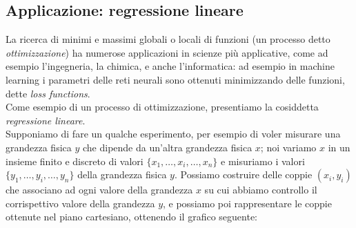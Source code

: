 \subsection{Applicazione: regressione lineare}
La ricerca di minimi e massimi globali o locali di funzioni (un processo detto \emph{ottimizzazione}) ha numerose applicazioni in scienze più applicative, come ad esempio l'ingegneria, la chimica, e anche l'informatica: ad esempio in machine learning i parametri delle reti neurali sono ottenuti minimizzando delle funzioni, dette \emph{loss functions}.\\
Come esempio di un processo di ottimizzazione, presentiamo la cosiddetta \emph{regressione lineare}.\\
Supponiamo di fare un qualche esperimento, per esempio di voler misurare una grandezza fisica $y$ che dipende da un'altra grandezza fisica $x$; noi variamo $x$ in un insieme finito e discreto di valori $\{x_1, \dots, x_i, \dots, x_n\}$ e misuriamo i valori $\{y_1, \dots, y_i, \dots, y_n\}$ della grandezza fisica $y$. Possiamo costruire delle coppie $(x_i, y_i)$ che associano ad ogni valore della grandezza $x$ su cui abbiamo controllo il corrispettivo valore della grandezza $y$, e possiamo poi rappresentare le coppie ottenute nel piano cartesiano, ottenendo il grafico seguente:
\begin{center}
\end{center}
